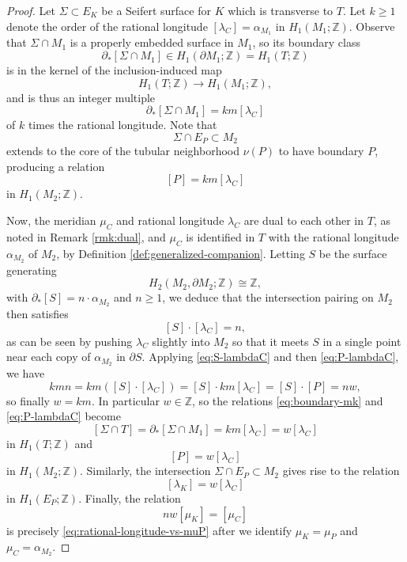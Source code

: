 \documentclass[11pt]{amsart}
\numberwithin{equation}{section}
\numberwithin{theorem}{section}
\theoremstyle{definition}
\newcommand{\Z}{\mathbb{Z}}
\begin{document}
\begin{proof}
Let $\Sigma \subset E_K$ be a Seifert surface for $K$ which is transverse to $T$.  Let $k \geq 1$ denote the order of the rational longitude $[\lambda_C] = \alpha_{M_1}$ in $H_1(M_1;\Z)$. 
Observe that $\Sigma \cap M_1$ is a properly embedded surface in $M_1$, so its boundary class
\begin{equation*} \label{eq:boundary-sigma-y0}
\partial_*[\Sigma \cap M_1] \in H_1(\partial M_1;\Z) = H_1(T;\Z)
\end{equation*}
is in the kernel of the inclusion-induced map \[H_1(T;\Z)\to H_1(M_1;\Z),\]  and is thus an integer multiple
\begin{equation}\label{eq:boundary-mk}
\partial_*[\Sigma \cap M_1]= km[\lambda_C]\end{equation}
of $k$ times the rational longitude.  Note that \[\Sigma \cap  E_P\subset M_2\] extends to the core of the tubular neighborhood $\nu(P)$ to have boundary $P$, producing a relation
\begin{equation} \label{eq:P-lambdaC}
[P] = km[\lambda_C]
\end{equation}
in $H_1(M_2;\Z)$.

Now, the meridian $\mu_C$ and rational longitude $\lambda_C$ are  dual to each other in $T$, as noted in Remark \ref{rmk:dual}, and $\mu_C$ is identified in $T$ with the rational longitude $\alpha_{M_2}$ of $M_2$, by Definition \ref{def:generalized-companion}.  Letting $S$ be the surface generating 
\[H_2(M_2,\partial M_2;\Z) \cong \Z,\] with $\partial_*[S] = n\cdot \alpha_{M_2}$ and $n \geq 1$, we deduce that the intersection pairing on $M_2$ then satisfies
\begin{equation} \label{eq:S-lambdaC}
[S] \cdot [\lambda_C] = n,
\end{equation}
as can be seen by pushing $\lambda_C$ slightly into $M_2$ so that it meets $S$ in a single point near each copy of $\alpha_{M_2}$ in $\partial S$.  Applying \eqref{eq:S-lambdaC} and then \eqref{eq:P-lambdaC}, we have
\[ kmn = km\left([S] \cdot [\lambda_C]\right) = [S] \cdot km[\lambda_C] = [S] \cdot [P] = nw, \]
so finally $w = km$.  In particular $w \in \Z$, so the relations \eqref{eq:boundary-mk} and \eqref{eq:P-lambdaC} become
\[ [\Sigma \cap T] = \partial_*[\Sigma \cap M_1] = km [\lambda_C]=w[\lambda_C] \]
in $H_1(T;\Z)$ and \[[P] = w[\lambda_C]\] in $H_1(M_2;\Z)$.  Similarly, the intersection $\Sigma \cap E_P \subset M_2$  gives rise to the relation \[[\lambda_K] = w[\lambda_C]\] in $H_1(E_P;\Z)$.  Finally, the relation \[nw[\mu_K] = [\mu_C]\] is precisely \eqref{eq:rational-longitude-vs-muP} after we identify $\mu_K = \mu_P$ and $\mu_C = \alpha_{M_2}$.
\end{proof}
\end{document}
